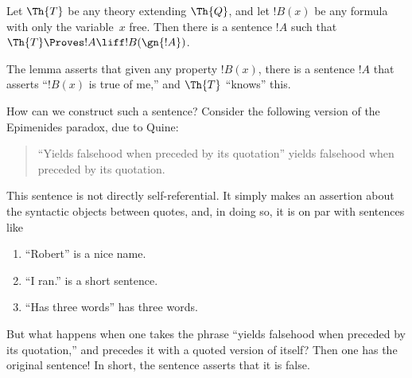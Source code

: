 \documentclass[../../../include/open-logic-section]{subfiles}
\begin{document}
\begin{lem}
Let $\Th{T}$ be any theory extending $\Th{Q}$, and let $!B(x)$ be any
formula with only the variable~$x$ free. Then there is a sentence $!A$
such that $\Th{T} \Proves!A \liff !B(\gn{!A})$.
\end{lem}

The lemma asserts that given any property $!B(x)$, there is a sentence
$!A$ that asserts ``$!B(x)$ is true of me,'' and $\Th{T}$ ``knows''
this.

How can we construct such a sentence? Consider the following version
of the Epimenides paradox, due to Quine:
\begin{quote}
``Yields falsehood when preceded by its quotation'' yields falsehood
when preceded by its quotation.
\end{quote}
This sentence is not directly self-referential. It simply makes an
assertion about the syntactic objects between quotes, and, in doing
so, it is on par with sentences like
\begin{enumerate}
\item ``Robert'' is a nice name.
\item ``I ran.'' is a short sentence.
\item ``Has three words'' has three words.
\end{enumerate}
But what happens when one takes the phrase ``yields falsehood when
preceded by its quotation,'' and precedes it with a quoted version of
itself? Then one has the original sentence!{} In short, the sentence
asserts that it is false.
\end{document}
